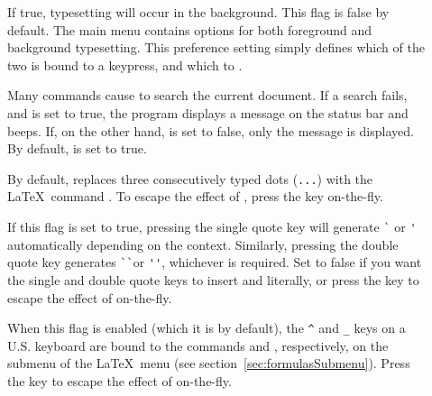 \documentclass{report}
\begin{document}
\begin{description}
	\item[] If true, typesetting will occur in the 
	background.  This flag is false by default.  The main 
	 menu contains options for both foreground and 
	background typesetting.  This preference setting simply defines 
	which of the two is bound to a  keypress, and which to 
	.

	\item[] Many commands cause 
	 to search the current document.  If a 
	search fails, and  is set to true, the 
	program displays a message on the status bar and beeps.  If, on 
	the other hand,  is set to false, only 
	the message is displayed.  By default,  
	is set to true.

	\item[] By default,  
	replaces three consecutively typed dots (\texttt{...}) with the 
	\LaTeX\ command .  To escape the effect of 
	, press the  key on-the-fly.

	\item[] If this flag is set to true, pressing the
	single quote key \key{\straightquote} will generate \verb/`/ or \verb/'/
	automatically depending on the context.  Similarly, pressing the double
	quote key \key{\"} generates \verb/``/or \verb/''/, whichever is
	required.  Set  to false if you want the single and
	double quote keys to insert \key{\straightquote} and \key{\"} literally,
	or press the  key to escape the effect of 
	on-the-fly.

	\item[] When this flag is enabled (which it is by 
	default), the \verb|^| and \verb|_| keys on a U.S. keyboard are 
	bound to the commands  and , 
	respectively, on the  submenu of the \LaTeX\ menu 
	(see section~\ref{sec:formulasSubmenu}).  Press the  key 
	to escape the effect of  on-the-fly.



\end{description}
\end{document}
